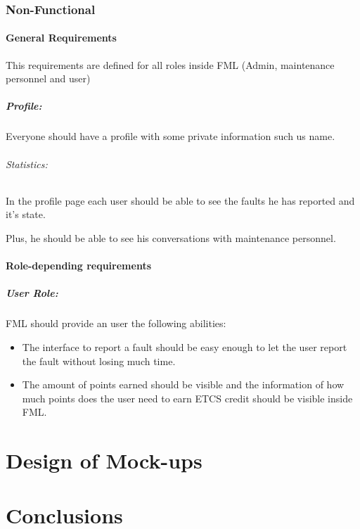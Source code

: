 \documentclass{report}
\begin{document}
\subsection{Non-Functional}

\subsubsection{General Requirements}

This requirements are defined for all roles inside FML (Admin, maintenance personnel and user)

\paragraph{Profile: } Everyone should have a profile with some private information such us name.
\subparagraph{Statistics: } In the profile page each user should be able to see the faults he has reported and it's state.

Plus, he should be able to see his conversations with maintenance personnel.


\subsubsection{Role-depending requirements}

\paragraph{User Role: }
FML should provide an user the following abilities:
\begin{itemize}
\item The interface to report a fault should be easy enough to let the user report the fault without losing much time.
\item The amount of points earned should be visible and the information of how much points does the user need to earn ETCS credit should be visible inside FML.
\end{itemize}


\chapter{Design of Mock-ups}

\chapter{Conclusions}


\appendix
\end{document}
